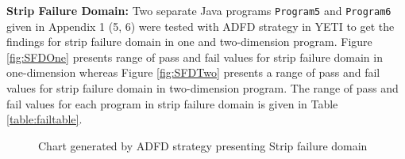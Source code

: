 



\newpage
\noindent \textbf{Strip Failure Domain:} Two separate Java programs \verb+Program5+ and \verb+Program6+ given in Appendix 1 (5, 6) were tested with ADFD strategy in YETI to get the findings for strip failure domain in one and two-dimension program. Figure \ref{fig:SFDOne} presents range of pass and fail values for strip failure domain in one-dimension whereas Figure \ref{fig:SFDTwo} presents a range of pass and fail values for strip failure domain in two-dimension program. The range of pass and fail values for each program in strip failure domain is given in Table \ref{table:failtable}.


%
\begin{figure} [H]
\centering
{}
\bigskip
{}
\bigskip
\caption{Chart generated by ADFD strategy presenting Strip failure domain}
\end{figure}






